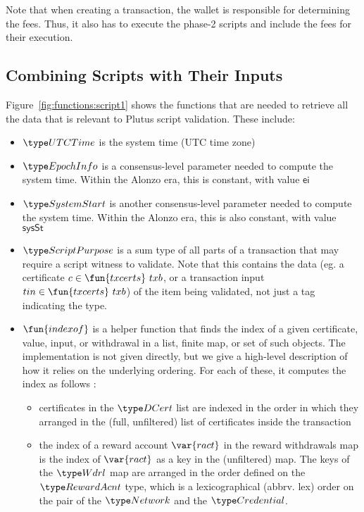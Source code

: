 Note that when creating a transaction, the wallet is responsible for
determining the fees. Thus, it also has to execute the phase-2 scripts
and include the fees for their execution.

\subsection{Combining Scripts with Their Inputs}
\label{sec:scripts-inputs}

Figure~\ref{fig:functions:script1} shows the functions that are needed to
retrieve all the data that is relevant to Plutus script validation.
These include:

\begin{itemize}
\item $\UTCTime$ is the system time (UTC time zone)
\item $\EpochInfo$ is a consensus-level parameter needed to compute the system time. Within
the Alonzo era, this is constant, with value $\mathsf{ei}$
\item $\SystemStart$ is another consensus-level parameter needed to compute the system time. Within
the Alonzo era, this is also constant, with value $\mathsf{sysSt}$
\item
  $\ScriptPurpose$ is a sum type of all parts of a transaction that may
  require a script witness to validate. Note that this contains the data
  (eg. a certificate $c \in \fun{txcerts}~{txb}$,
  or a transaction input $tin \in \fun{txcerts}~{txb}$) of the item being validated,
  not just a tag indicating the type.
\item
  $\fun{indexof}$ is a helper function that finds the index of a given certificate, value, input, or
  withdrawal in a list, finite map, or set of such objects. The implementation is not given
  directly, but we give a high-level description of how it relies on the underlying ordering.
  For each of these, it computes the index as follows :
  \begin{itemize}
    \item certificates in the $\DCert$ list are indexed in the order in which they arranged
    in the (full, unfiltered) list of certificates inside the transaction
    \item the index of a reward account $\var{ract}$ in the reward withdrawals map is
    the index of $\var{ract}$ as a key in the (unfiltered) map. The keys of the $\Wdrl$
    map are arranged in the order defined on the $\RewardAcnt$ type, which is a lexicographical
    (abbrv. lex) order
    on the pair of the $\Network$ and the $\Credential$.

\end{itemize}
\end{itemize}
